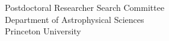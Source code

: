 \documentclass[12pt]{letter}
\begin{document}
\begin{letter}{
               Postdoctoral Researcher Search Committee \\
               Department of Astrophysical Sciences \\
               Princeton University
           }


\end{letter}
\end{document}
